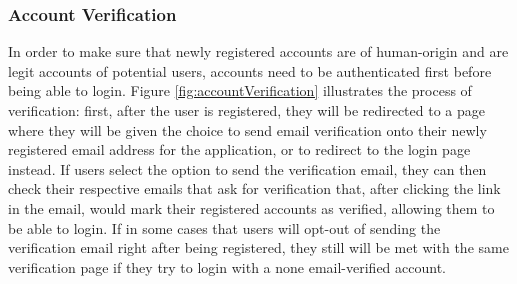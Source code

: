 \subsubsection{Account Verification}
In order to make sure that newly registered accounts are of human-origin and are legit accounts of potential users, accounts need to be authenticated first before being able to login. Figure \ref{fig:accountVerification}   illustrates the process of verification: first, after the user is registered, they will be redirected to a page where they will be given the choice to send email verification onto their newly registered email address for the application, or to redirect to the login page instead. If users select the option to send the verification email, they can then check their respective emails that ask for verification that, after clicking the link in the email, would mark their registered accounts as verified, allowing them to be able to login. If in some cases that users will opt-out of sending the verification email right after being registered, they still will be met with the same verification page if they try to login with a none email-verified account. 
